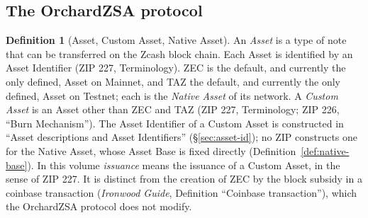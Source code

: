 \documentclass[11pt,a4paper]{article}
\theoremstyle{definition}
\newtheorem{definition}[theorem]{Definition}
\begin{document}
\subsection{The OrchardZSA protocol}\label{sec:intro-protocol}

\begin{definition}[Asset, Custom Asset, Native Asset]\label{def:asset}
An \emph{Asset} is a type of note that can be transferred on the Zcash block
chain. Each Asset is identified by an Asset Identifier (ZIP 227, Terminology).
ZEC is the default, and currently the only defined, Asset on Mainnet, and TAZ
the default, and currently the only defined, Asset on Testnet; each is the
\emph{Native Asset} of its network. A \emph{Custom Asset} is an Asset other than
ZEC and TAZ (ZIP 227, Terminology; ZIP 226, ``Burn Mechanism''). The Asset
Identifier of a Custom Asset is constructed in ``Asset descriptions and Asset
Identifiers'' (\S\ref{sec:asset-id}); no ZIP constructs one for the Native
Asset, whose Asset Base is fixed directly (Definition~\ref{def:native-base}). In
this volume \emph{issuance} means the issuance of a Custom Asset, in the sense
of ZIP 227. It is distinct from the creation of ZEC by the block subsidy in a
coinbase transaction (\emph{Ironwood Guide}, Definition ``Coinbase
transaction''), which the OrchardZSA protocol does not modify.
\end{definition}
\end{document}
